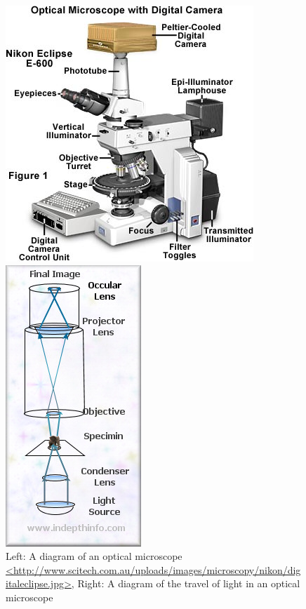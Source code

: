 \documentclass{article}
\begin{document}
\begin{figure}[h]
	\begin{minipage}{.5\textwidth}
		\centering
		\includegraphics[scale=.3]{optical1.jpg}
	\end{minipage}		
	\begin{minipage}{.5\textwidth}
		\centering
		\includegraphics[scale=1.5]{optical2.jpg}
	\end{minipage}
	\caption{Left: A diagram of an optical microscope \url{<http://www.scitech.com.au/uploads/images/microscopy/nikon/digitaleclipse.jpg>}, Right: A diagram of the travel of light in an optical microscope}
\end{figure}
\end{document}
